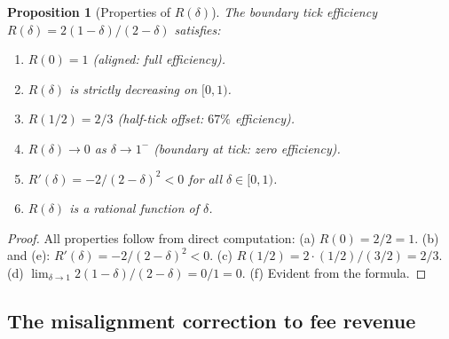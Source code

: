 \documentclass[11pt]{article}
\newtheorem{proposition}[theorem]{Proposition}
\theoremstyle{definition}
\theoremstyle{remark}
\begin{document}
\begin{proposition}[Properties of $R(\delta)$]
\label{prop:R_properties}
The boundary tick efficiency $R(\delta) = 2(1-\delta)/(2-\delta)$
satisfies:
\begin{enumerate}[label=(\alph*)]
\item $R(0) = 1$ \textup{(aligned: full efficiency)}.
\item $R(\delta)$ is strictly decreasing on $[0, 1)$.
\item $R(1/2) = 2/3$ \textup{(half-tick offset: $67\%$ efficiency)}.
\item $R(\delta) \to 0$ as $\delta \to 1^-$
\textup{(boundary at tick: zero efficiency)}.
\item $R'(\delta) = -2/(2-\delta)^2 < 0$ for all
$\delta \in [0,1)$.
\item $R(\delta)$ is a \textup{rational} function of $\delta$.
\end{enumerate}
\end{proposition}
\begin{proof}
All properties follow from direct computation:
(a) $R(0) = 2/2 = 1$. (b) and (e): $R'(\delta) = -2/(2-\delta)^2 < 0$.
(c) $R(1/2) = 2 \cdot (1/2)/(3/2) = 2/3$.
(d) $\lim_{\delta \to 1} 2(1-\delta)/(2-\delta) = 0/1 = 0$.
(f) Evident from the formula.
\end{proof}

\subsection{The misalignment correction to fee revenue}
\end{document}
